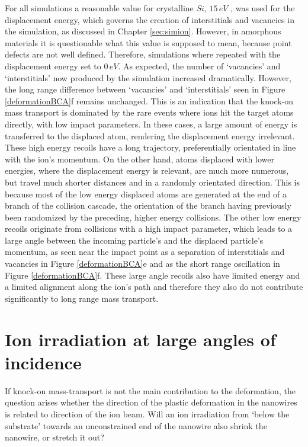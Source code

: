 For all simulations a reasonable value for crystalline $Si$, $15\,eV$ \cite{corbett_production_1965}, was used for the displacement energy, which governs the creation of interstitials and vacancies in the simulation, as discussed in Chapter \ref{sec:simion}. However, in amorphous materials it is questionable what this value is supposed to mean, because point defects are not well defined. Therefore, simulations where repeated with the displacement energy set to $0\,eV$. As expected, the number of `vacancies' and `interstitials' now produced by the simulation increased dramatically. However, the long range difference between `vacancies' and `interstitials' seen in Figure \ref{deformationBCA}f remains unchanged. This is an indication that the knock-on mass transport is dominated by the rare events where ions hit the target atoms directly, with low impact parameters. In these cases, a large amount of energy is transferred to the displaced atom, rendering the displacement energy irrelevant. These high energy recoils have a long trajectory, preferentially orientated in line with the ion's momentum. On the other hand, atoms displaced with lower energies, where the displacement energy is relevant, are much more numerous, but travel much shorter distances and in a randomly orientated direction. This is because most of the low energy displaced atoms are generated at the end of a branch of the collision cascade, the orientation of the branch having previously been randomized by the preceding, higher energy collisions. The other low energy recoils originate from collisions with a high impact parameter, which leads to a large angle between the incoming particle's and the displaced particle's momentum, as seen near the impact point as a separation of interstitials and vacancies in Figure \ref{deformationBCA}e and as the short range oscillation in Figure \ref{deformationBCA}f. These large angle recoils also have limited energy and a limited alignment along the ion's path and therefore they also do not contribute significantly to long range mass transport.

\clearpage
\section{Ion irradiation at large angles of incidence}

If knock-on mass-transport is not the main contribution to the deformation, the question arises whether the direction of the plastic deformation in the nanowires is related to direction of the ion beam. Will an ion irradiation from `below the substrate' towards an unconstrained end of the nanowire also shrink the nanowire, or stretch it out? 

